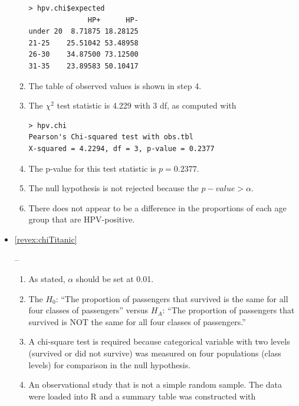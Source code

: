 \documentclass[10pt,openany]{book}\usepackage[]{graphicx}\usepackage[]{color}
\makeatletter
\newenvironment{kframe}{%
 \def\at@end@of@kframe{}%
 \ifinner\ifhmode%
  \def\at@end@of@kframe{\end{minipage}}%
  \begin{minipage}{\columnwidth}%
 \fi\fi%
 \def\FrameCommand##1{\hskip\@totalleftmargin \hskip-\fboxsep
 \colorbox{shadecolor}{##1}\hskip-\fboxsep
     \hskip-\linewidth \hskip-\@totalleftmargin \hskip\columnwidth}%
 \MakeFramed {\advance\hsize-\width
   \@totalleftmargin\z@ \linewidth\hsize
   \@setminipage}}%
 {\par\unskip\endMakeFramed%
 \at@end@of@kframe}
\newenvironment{knitrout}{}{} %
\makeatother
\begin{document}
\begin{itemize}
\begin{enumerate}
\begin{knitrout}
\color{fgcolor}\begin{kframe}
\begin{verbatim}
> hpv.chi$expected
              HP+      HP-
under 20  8.71875 18.28125
21-25    25.51042 53.48958
26-30    34.87500 73.12500
31-35    23.89583 50.10417
\end{verbatim}
\end{kframe}
\end{knitrout}
      \item The table of observed values is shown in step 4.
      \item The $\chi^{2}$ test statistic is 4.229 with 3 df, as computed with
\begin{knitrout}
\color{fgcolor}\begin{kframe}
\begin{verbatim}
> hpv.chi
Pearson's Chi-squared test with obs.tbl 
X-squared = 4.2294, df = 3, p-value = 0.2377
\end{verbatim}
\end{kframe}
\end{knitrout}
      \item The p-value for this test statistic is $p=0.2377$.
      \item The null hypothesis is not rejected because the $p-value>\alpha$.
      \item There does not appear to be a difference in the proportions of each age group that are HPV-positive.
    \end{enumerate}
  \item \hypertarget{ans:chiTitanic}{\ref{revex:chiTitanic}} --
    \begin{enumerate}
      \item As stated, $\alpha$ should be set at 0.01.
      \item The $H_{0}$: ``The proportion of passengers that survived is the same for all four classes of passengers'' versus $H_{A}$: ``The proportion of passengers that survived is NOT the same for all four classes of passengers.''
      \item A chi-square test is required because categorical variable with two levels (survived or did not survive) was measured on four populations (class levels) for comparison in the null hypothesis.
      \item An observational study that is not a simple random sample.  The data were loaded into R and a summary table was constructed with

\end{enumerate}
\end{itemize}
\end{document}
